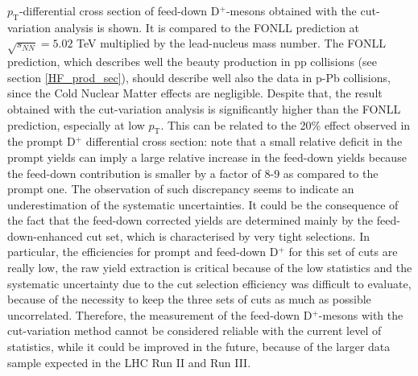 \documentclass[b5paper,10pt,twoside,oldstyle,classica]{toptesi}
\newcommand{\pt}{p_\text{T}}
\begin{document}
\begin{figure}[tb]
\end{figure} $\pt$-differential cross section of feed-down D$^+$-mesons obtained with the cut-variation analysis is shown. It is compared to the FONLL prediction at $\sqrt{s_{NN}} = 5.02$ TeV multiplied by the lead-nucleus mass number. The FONLL prediction, which describes well the beauty production in pp collisions (see section \ref{HF_prod_sec}), should describe well also the data in p-Pb collisions, since the Cold Nuclear Matter effects are negligible. Despite that, the result obtained with the cut-variation analysis is significantly higher than the FONLL prediction, especially at low $\pt$. This can be related to the 20\% effect observed in the prompt D$^+$ differential cross section: note that a small relative deficit in the prompt yields can imply a large relative increase in the feed-down yields because the feed-down contribution is smaller by a factor of 8-9 as compared to the prompt one. The observation of such discrepancy seems to indicate an underestimation of the systematic uncertainties. It could be the consequence of the fact that the feed-down corrected yields are determined mainly by the feed-down-enhanced cut set, which is characterised by very tight selections. In particular, the efficiencies for prompt and feed-down D$^+$ for this set of cuts are really low, the raw yield extraction is critical because of the low statistics and the systematic uncertainty due to the cut selection efficiency was difficult to evaluate, because of the necessity to keep the three sets of cuts as much as possible uncorrelated. Therefore, the measurement of the feed-down D$^+$-mesons with the cut-variation method cannot be considered reliable with the current level of statistics, while it could be improved in the future, because of the larger data sample expected in the LHC Run II and Run III.    
\end{document}
